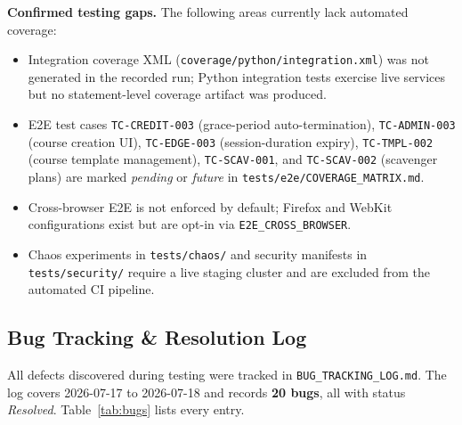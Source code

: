 \documentclass[12pt,a4paper]{article}
\begin{document}
\noindent\textbf{Confirmed testing gaps.}
The following areas currently lack automated coverage:
\begin{itemize}[leftmargin=1.5em]
  \item Integration coverage XML (\texttt{coverage/python/integration.xml}) was not
        generated in the recorded run; Python integration tests exercise live
        services but no statement-level coverage artifact was produced.
  \item E2E test cases \texttt{TC-CREDIT-003} (grace-period auto-termination),
        \texttt{TC-ADMIN-003} (course creation UI), \texttt{TC-EDGE-003}
        (session-duration expiry), \texttt{TC-TMPL-002} (course template
        management), \texttt{TC-SCAV-001}, and \texttt{TC-SCAV-002}
        (scavenger plans) are marked \textit{pending} or \textit{future} in
        \texttt{tests/e2e/COVERAGE\_MATRIX.md}.
  \item Cross-browser E2E is not enforced by default; Firefox and WebKit
        configurations exist but are opt-in via \texttt{E2E\_CROSS\_BROWSER}.
  \item Chaos experiments in \texttt{tests/chaos/} and security manifests in
        \texttt{tests/security/} require a live staging cluster and are
        excluded from the automated CI pipeline.
\end{itemize}

\subsection{Bug Tracking \& Resolution Log}

All defects discovered during testing were tracked in
\texttt{BUG\_TRACKING\_LOG.md}. The log covers 2026-07-17 to 2026-07-18
and records \textbf{20 bugs}, all with status \textit{Resolved}.
Table~\ref{tab:bugs} lists every entry.
\end{document}

